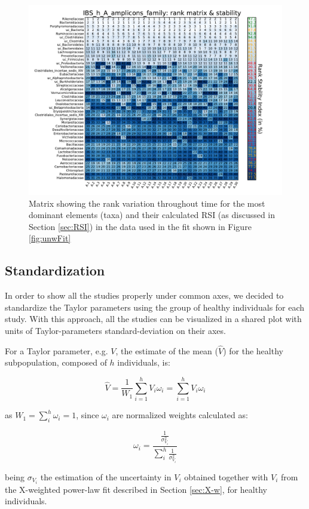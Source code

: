 \begin{figure}
	\centering
	\includegraphics[width=\textwidth]{results/corrank/IBS_h_A_amplicons_family_Rank}
	\caption{Matrix showing the rank variation throughout time for the most dominant elements (taxa) and their calculated RSI (as discussed in Section \ref{sec:RSI}) in the data used in the fit shown in Figure \ref{fig:unwFit}}
	\label{fig:corrank}
\end{figure}

\subsection*{Standardization} \label{sec:stan}
In order to show all the studies properly under common axes, we decided to standardize the Taylor parameters using the group of healthy individuals for each study. With this approach, all the studies can be visualized in a shared plot with units of Taylor-parameters standard-deviation on their axes.

For a Taylor parameter, e.g. $V$, the estimate of the mean ($\widehat{V}$) for the healthy subpopulation, composed of $h$ individuals, is:
\begin{linenomath}
$$\widehat{V} = \frac{1}{W_1}\sum_{i=1}^h V_i \omega_i=\sum_{i=1}^h V_i \omega_i$$
\end{linenomath}
as $W_1=\sum_i^h \omega_i=1$, since $\omega_i$ are normalized weights calculated as:
\begin{linenomath}
$$\omega_i = \frac{\frac{1}{\sigma^2_{V_i}}}{\sum_i^h\frac{1}{\sigma^2_{V_i}}}$$
\end{linenomath}
being $\sigma_{V_i}$ the estimation of the uncertainty in $V_i$ obtained together with $V_i$ from the X-weighted power-law fit described in Section \ref{sec:X-w}, for healthy individuals.

